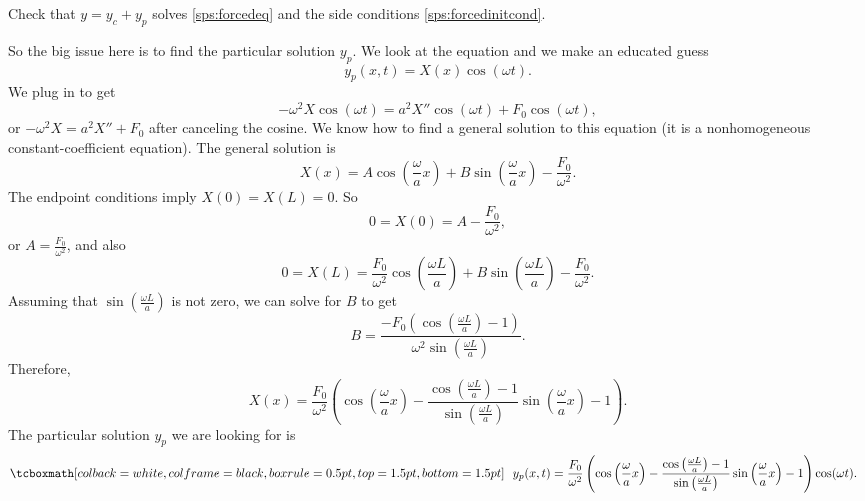 \begin{exercise}
Check that $y = y_c + y_p$ solves \eqref{sps:forcedeq} and the
side conditions \eqref{sps:forcedinitcond}.
\end{exercise}

So the big issue here is to find the particular solution $y_p$.
We look at the equation and we make an educated guess
\begin{equation*}
y_p(x,t) = X(x) \cos (\omega t) .
\end{equation*}
We plug in to get
\begin{equation*}
-\omega^2 X \cos ( \omega t) = a^2 X'' \cos ( \omega t) +
F_0 \cos ( \omega t ) ,
\end{equation*}
or
$-\omega^2 X = a^2 X'' + F_0$ after canceling the cosine.
We know how to find a general solution to this equation (it is a
nonhomogeneous constant-coefficient equation).
The general solution is
\begin{equation*}
X(x) = A \cos \left( \frac{\omega}{a} x \right)
+ B \sin \left( \frac{\omega}{a} x \right) -
\frac{F_0}{\omega^2} .
\end{equation*}
The endpoint conditions imply $X(0) = X(L) = 0$.  So
\begin{equation*}
0 = X(0) = A - \frac{F_0}{\omega^2} ,
\end{equation*}
or $A = \frac{F_0}{\omega^2}$, and also
\begin{equation*}
0 = X(L)
= \frac{F_0}{\omega^2} \cos \left( \frac{\omega L}{a} \right)
+ B \sin \left( \frac{\omega L}{a} \right) -
\frac{F_0}{\omega^2} .
\end{equation*}
Assuming that $\sin ( \frac{\omega L}{a} )$ is not zero, we can solve for $B$ to
get
\begin{equation} \label{natfreq:Beq}
B = 
\frac{-F_0 \left( \cos \left( \frac{\omega L}{a} \right) - 1 \right)}%
{\omega^2 \sin \left( \frac{\omega L}{a} \right)}.
\end{equation}
Therefore,
\begin{equation*}
X(x) =
\frac{F_0}{\omega^2} \left(
\cos \left(  \frac{\omega}{a} x \right) -
\frac{\cos \left( \frac{\omega L}{a} \right) - 1}%
{\sin \left( \frac{\omega L}{a} \right)}
\sin \left( \frac{\omega}{a} x \right)
- 1
\right) .
\end{equation*}
The particular solution $y_p$ we are looking for is
\begin{equation*}
\mybxbg{~~
y_p(x,t) =
\frac{F_0}{\omega^2} \left(
\cos \left( \frac{\omega}{a} x \right) -
\frac{\cos \left( \frac{\omega L}{a} \right) - 1}%
{\sin \left( \frac{\omega L}{a}\right)}
\sin \left( \frac{\omega}{a} x \right)
-1
\right)
\cos ( \omega t) .
~~}
\end{equation*}

